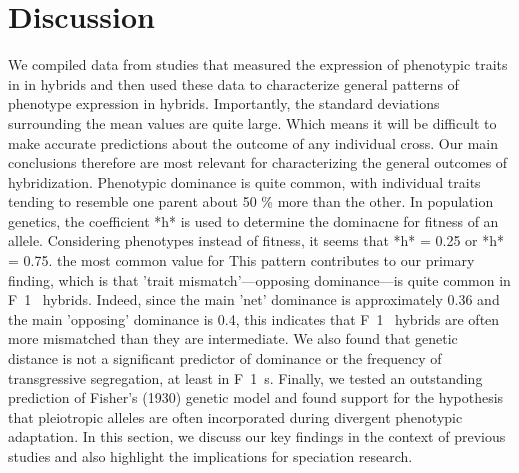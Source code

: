 \documentclass[times, twoside, watermark]{zHenriquesLab-StyleBioRxiv}
\begin{document}

\section*{Discussion}
We compiled data from studies that measured the expression of phenotypic traits in in hybrids and then used these data to characterize general patterns of phenotype expression in hybrids. Importantly, the standard deviations surrounding the mean values are quite large. Which means it will be difficult to make accurate predictions about the outcome of any individual cross. Our main conclusions therefore are most relevant for characterizing the general outcomes of hybridization. Phenotypic dominance is quite common, with individual traits tending to resemble one parent about 50 \% more than the other. In population genetics, the coefficient *h* is used to determine the dominacne for fitness of an allele. Considering phenotypes instead of fitness, it seems that *h* = 0.25 or *h* = 0.75. the most common value for This pattern contributes to our primary finding, which is that 'trait mismatch'---opposing dominance---is quite common in F~1~ hybrids. Indeed, since the main 'net' dominance is approximately 0.36 and the main 'opposing' dominance is 0.4, this indicates that F~1~ hybrids are often more mismatched than they are intermediate. We also found that genetic distance is not a significant predictor of dominance or the frequency of transgressive segregation, at least in F~1~s. Finally, we tested an outstanding prediction of Fisher's (1930) genetic model and found support for the hypothesis that pleiotropic alleles are often incorporated during divergent phenotypic adaptation. In this section, we discuss our key findings in the context of previous studies and also highlight the implications for speciation research.
\end{document}
